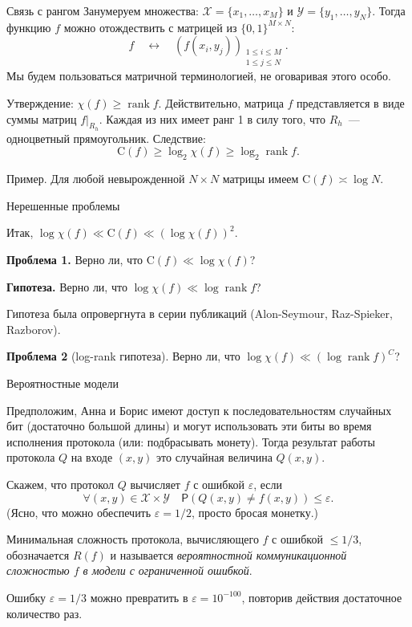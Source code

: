 \documentclass[handout]{beamer}
\renewcommand\le{\leqslant}
\renewcommand\ge{\geqslant}
\newcommand\eps{\varepsilon}
\DeclareMathOperator{\rank}{rank}
\renewcommand\C{\mathrm{C}}
\begin{document}
\begin{frame}{Связь с рангом}
    Занумеруем множества: $\mathcal X=\{x_1,\ldots,x_M\}$ и $\mathcal
    Y=\{y_1,\ldots,y_N\}$. Тогда функцию $f$ можно отождествить с матрицей из
    $\{0,1\}^{M\times N}$:
    $$
    f\quad \longleftrightarrow\quad (f(x_i,y_j))_{\substack{1\le i\le M\\1\le j\le N}}.
    $$
    Мы будем пользоваться матричной терминологией, не оговаривая этого особо.
    \pause\vspace{5pt}

    Утверждение: $\chi(f) \ge \rank f$. Действительно, матрица $f$ представляется
    в виде суммы матриц $f|_{R_h}$. Каждая из них имеет ранг 1 в силу того, что
    $R_h$~--- одноцветный прямоугольник. Следствие:
    $$
    \C(f) \ge \log_2\chi(f) \ge \log_2 \rank f.
    $$

    Пример. Для любой невырожденной $N\times N$ матрицы имеем $\C(f)\asymp\log
    N$.
\end{frame}

\begin{frame}{Нерешенные проблемы}

    Итак, $\log\chi(f) \ll \C(f) \ll (\log\chi(f))^2$. 

    \textbf{Проблема 1.} Верно ли, что $\C(f) \ll \log\chi(f)$?
    \pause\vspace{10pt}

    \textbf{Гипотеза.} Верно ли, что $\log\chi(f)\ll\log\rank f$?
    \pause\vspace{5pt}

    Гипотеза была опровергнута в серии публикаций (Alon-Seymour, Raz-Spieker, Razborov).
    \pause\vspace{5pt}

    \textbf{Проблема 2} (log-rank гипотеза). Верно ли, что $\log\chi(f)\ll (\log\rank f)^C$?
\end{frame}

\begin{frame}{Вероятностные модели}

    Предположим, Анна и Борис имеют доступ к последовательностям случайных бит
    (достаточно большой длины) и могут использовать эти биты во время исполнения
    протокола (или: подбрасывать монету). Тогда результат работы протокола $Q$ на входе $(x,y)$ это
    случайная величина $Q(x,y)$.
    
    Скажем, что протокол $Q$ вычисляет $f$ с ошибкой $\eps$, если
    $$
    \forall (x,y)\in\mathcal X\times\mathcal Y\quad \mathsf{P}(Q(x,y)\ne
    f(x,y))\le \eps.
    $$
    (Ясно, что можно обеспечить $\eps=1/2$, просто бросая монетку.)
    \pause\vspace{5pt}

    Минимальная сложность протокола, вычисляющего $f$ с ошибкой $\le 1/3$, 
    обозначается $R(f)$ и называется \textit{вероятностной коммуникационной
    сложностью $f$ в модели с ограниченной ошибкой}.

    Ошибку $\eps=1/3$ можно превратить в $\eps=10^{-100}$, повторив
    действия достаточное количество раз.

\end{frame}
\end{document}
